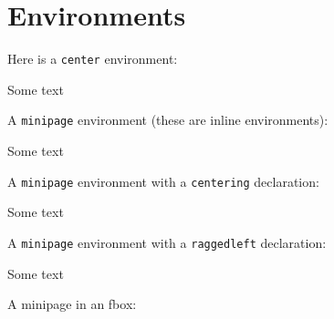 
\section{Environments}

Here is a {\tt center} environment:
\begin{center}
Some text
\end{center}

A {\tt minipage} environment (these are inline environments):

\begin{minipage}{\linewidth}
Some text
\end{minipage}

A {\tt minipage} environment with a {\tt centering} declaration:

\begin{minipage}{\linewidth}
\centering
Some text
\end{minipage}

A {\tt minipage} environment with a {\tt raggedleft} declaration:

\begin{minipage}{\linewidth}
\raggedleft
Some text
\end{minipage}

A minipage in an fbox:

